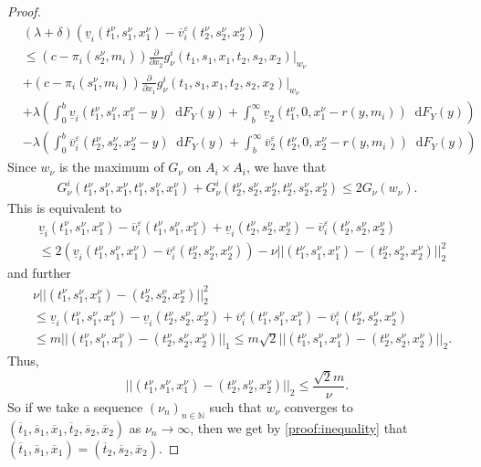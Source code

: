 \documentclass[10pt,a4paper]{amsart}
\newcommand*\diff{\mathop{}\!\mathrm{d}}
\begin{document}
\begin{proof}
    \begin{align}
    \label{proof:(delta+lambda)}
         &(\lambda + \delta)(\underline{v}_i(t_1^\nu,s_1^\nu,x_1^\nu)-\overline{v}^\varepsilon_i(t_2^\nu,s_2^\nu,x_2^\nu)) \nonumber\\
        &\leq \left(c-\pi_i(s_2^\nu,m_i)\right)\frac{\partial}{\partial x_2}g_{\nu}^i(t_1,s_1,x_1,t_2,s_2,x_2)|_{w_{\nu}} \nonumber \\&+ \left(c-\pi_i(s_1^\nu,m_i)\right)\frac{\partial}{\partial x_1}g_{\nu}^i(t_1,s_1,x_1,t_2,s_2,x_2)|_{w_{\nu}}\nonumber\\
        &+\lambda \left(\int_{0}^{b}\underline{v}_i(t_1^\nu,s_1^\nu,x_1^\nu-y)\diff F_Y(y)  
   +\int_{b}^{\infty}\underline{v}_2(t_1^\nu,0,x_1^\nu-r(y,m_i))\diff F_Y(y)\right) \nonumber\\
   &-  \lambda \left(\int_{0}^{b}\overline{v}^\varepsilon_i(t_2^\nu,s_2^\nu,x_2^\nu-y)\diff F_Y(y)  
    +\int_{b}^{\infty}\overline{v}^\varepsilon_2(t_2^\nu,0,x_2^\nu-r(y,m_i))\diff F_Y(y)\right)
    \end{align}
    Since $w_\nu$ is the maximum of $G_\nu$ on $A_i \times A_i$,  we have that 
    \begin{align*}
        G_\nu ^i (t_1^\nu,s_1^\nu,x_1^\nu,t_1^\nu,s_1^\nu,x_1^\nu)+G_\nu ^i (t_2^\nu,s_2^\nu,x_2^\nu,t_2^\nu,s_2^\nu,x_2^\nu) \leq 2G_\nu(w_\nu).
    \end{align*}
    This is equivalent to
    \begin{align*}
        &\underline{v}_i(t_1^\nu,s_1^\nu,x_1^\nu)-\overline{v}_i^\varepsilon(t_1^\nu,s_1^\nu,x_1^\nu)+ \underline{v}_i(t_2^\nu,s_2^\nu,x_2^\nu)-\overline{v}_i^\varepsilon(t_2^\nu,s_2^\nu,x_2^\nu) \\
        &\leq 2(\underline{v}_i(t_1^\nu,s_1^\nu,x_1^\nu)-\overline{v}_i^\varepsilon(t_2^\nu,s_2^\nu,x_2^\nu)) - \nu ||(t_1^\nu,s_1^\nu,x_1^\nu)-(t_2^\nu,s_2^\nu,x_2^\nu)||^2_2
    \end{align*}
    and further 
    \begin{align*}
       &\nu||(t_1^\nu,s_1^\nu,x_1^\nu)-(t_2^\nu,s_2^\nu,x_2^\nu)||^2_2 \\
       &\leq \underline{v}_i(t_1^\nu,s_1^\nu,x_1^\nu)- \underline{v}_i(t_2^\nu,s_2^\nu,x_2^\nu)+ \overline{v}_i^\varepsilon(t_1^\nu,s_1^\nu,x_1^\nu)-\overline{v}_i^\varepsilon(t_2^\nu,s_2^\nu,x_2^\nu)\\
       & \leq m ||(t_1^\nu,s_1^\nu,x_1^\nu)-(t_2^\nu,s_2^\nu,x_2^\nu)||_1
       \leq m \sqrt{2} ||(t_1^\nu,s_1^\nu,x_1^\nu)-(t_2^\nu,s_2^\nu,x_2^\nu)||_2.
    \end{align*}
    Thus,
    \begin{equation}
    \label{proof:inequality}
        ||(t_1^\nu,s_1^\nu,x_1^\nu)-(t_2^\nu,s_2^\nu,x_2^\nu)||_2 \leq \frac{\sqrt{2}m}{\nu}.
    \end{equation}
    So if we take a sequence $(\nu_n)_{n \in \mathbb{N}}$ such that $w_\nu$ converges to $(\overline{t}_1,\overline{s}_1,\overline{x}_1,\overline{t}_2,\overline{s}_2,\overline{x}_2)$ as $\nu_n \rightarrow \infty$, then we get by \eqref{proof:inequality} that $(\overline{t}_1,\overline{s}_1,\overline{x}_1)=(\overline{t}_2,\overline{s}_2,\overline{x}_2)$.


\end{proof}
\end{document}
